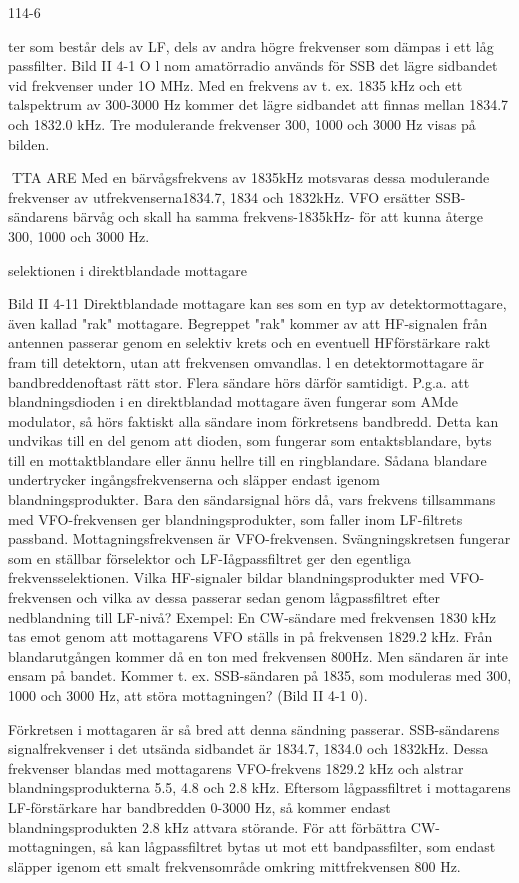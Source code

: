 \documentclass[a4paper,twoside,twocolumn,openright]{book}
\begin{document}
{{{114-6

ter som består dels av LF, dels av andra
högre frekvenser som dämpas i ett låg passfilter.
Bild II 4-1 O
l nom amatörradio används för SSB det lägre sidbandet vid frekvenser under 1O MHz.
Med en frekvens av t. ex. 1835 kHz och ett
talspektrum av 300-3000 Hz kommer det
lägre sidbandet att finnas mellan 1834.7
och 1832.0 kHz. Tre modulerande frekvenser 300, 1000 och 3000 Hz visas på bilden.

TTA ARE
Med en bärvågsfrekvens av 1835kHz motsvaras dessa modulerande frekvenser av
utfrekvenserna1834.7, 1834 och 1832kHz.
VFO ersätter SSB-sändarens bärvåg och
skall ha samma frekvens-1835kHz- för att
kunna återge 300, 1000 och 3000 Hz.

selektionen i direktblandade mottagare

Bild II 4-11
Direktblandade mottagare kan ses som en
typ av detektormottagare, även kallad "rak"
mottagare. Begreppet "rak" kommer av att
HF-signalen från antennen passerar genom en selektiv krets och en eventuell HFförstärkare rakt fram till detektorn, utan att
frekvensen omvandlas.
l en detektormottagare är bandbreddenoftast rätt stor. Flera sändare hörs därför
samtidigt.
P.g.a. att blandningsdioden i en direktblandad mottagare även fungerar som AMde modulator, så hörs faktiskt alla sändare
inom förkretsens bandbredd. Detta kan undvikas till en del genom att dioden, som
fungerar som entaktsblandare, byts till en
mottaktblandare eller ännu hellre till en ringblandare. Sådana blandare undertrycker ingångsfrekvenserna och släpper endast igenom blandningsprodukter. Bara den sändarsignal hörs då, vars frekvens tillsammans med VFO-frekvensen ger blandningsprodukter, som faller inom LF-filtrets passband. Mottagningsfrekvensen är VFO-frekvensen. Svängningskretsen fungerar som
en ställbar förselektor och LF-Iågpassfiltret
ger den egentliga frekvensselektionen.
Vilka HF-signaler bildar blandningsprodukter med VFO-frekvensen och vilka av
dessa passerar sedan genom lågpassfiltret
efter nedblandning till LF-nivå?
Exempel:
En CW-sändare med frekvensen 1830 kHz
tas emot genom att mottagarens VFO ställs
in på frekvensen 1829.2 kHz. Från blandarutgången kommer då en ton med frekvensen 800Hz.
Men sändaren är inte ensam på bandet.
Kommer t. ex. SSB-sändaren på 1835, som
moduleras med 300, 1000 och 3000 Hz, att
störa mottagningen? (Bild II 4-1 0).

Förkretsen i mottagaren är så bred att
denna sändning passerar. SSB-sändarens
signalfrekvenser i det utsända sidbandet är
1834.7, 1834.0 och 1832kHz. Dessa frekvenser blandas med mottagarens VFO-frekvens 1829.2 kHz och alstrar blandningsprodukterna 5.5, 4.8 och 2.8 kHz. Eftersom
lågpassfiltret i mottagarens LF-förstärkare
har bandbredden 0-3000 Hz, så kommer
endast blandningsprodukten 2.8 kHz attvara
störande. För att förbättra CW-mottagningen, så kan lågpassfiltret bytas ut mot ett
bandpassfilter, som endast släpper igenom
ett smalt frekvensområde omkring mittfrekvensen 800 Hz.

}}}
\end{document}
